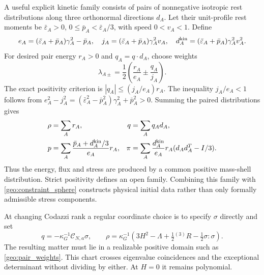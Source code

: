 A useful explicit kinetic family consists of pairs of nonnegative isotropic rest distributions along three orthonormal directions $d_A$. Let their unit-profile rest moments be $\bar\varepsilon_A>0$, $0\le\bar p_A<\bar\varepsilon_A/3$, with speed $0<v_A<1$. Define
\begin{equation}
 e_A=(\bar\varepsilon_A+\bar p_A)\gamma_A^2-\bar p_A,
 \quad j_A=(\bar\varepsilon_A+\bar p_A)\gamma_A^2v_A,
 \quad d_A^{\rm kin}=(\bar\varepsilon_A+\bar p_A)\gamma_A^2v_A^2.
 \label{geo:pair_coefficients}
\end{equation}
For desired pair energy $r_A>0$ and $q_A=q\cdot d_A$, choose weights
\begin{equation}
 \lambda_{A\pm}=\frac12\left(\frac{r_A}{e_A}\pm\frac{q_A}{j_A}\right).
 \label{geo:pair_weights}
\end{equation}
The exact positivity criterion is $|q_A|\le(j_A/e_A)r_A$. The inequality $j_A/e_A<1$ follows from
$e_A^2-j_A^2=(\bar\varepsilon_A^2-\bar p_A^2)\gamma_A^2+\bar p_A^2>0$.
Summing the paired distributions gives
\begin{align}
 \rho&=\sum_A r_A,&q&=\sum_Aq_Ad_A,\nonumber\\
 p&=\sum_A\frac{\bar p_A+d_A^{\rm kin}/3}{e_A}r_A,&
 \pi&=\sum_A\frac{d_A^{\rm kin}}{e_A}r_A
               (d_Ad_A^T-I/3).
 \label{geo:pair_moments}
\end{align}
Thus the energy, flux and stress are produced by a common positive mass-shell distribution. Strict positivity defines an open family. Combining this family with \eqref{geo:constraint_sphere} constructs physical initial data rather than only formally admissible stress components.

At changing Codazzi rank a regular coordinate choice is to specify $\sigma$ directly and set
\begin{equation}
 q=-\kappa_G^{-1}\mathcal C_{N,a}\sigma,\qquad
 \rho=\kappa_G^{-1}\left(3H^2-\Lambda+\tfrac12{}^{(3)}R
                                   -\tfrac12\sigma:\sigma\right).
 \label{geo:direct_chart}
\end{equation}
The resulting matter must lie in a realizable positive domain such as \eqref{geo:pair_weights}. This chart crosses eigenvalue coincidences and the exceptional determinant without dividing by either. At $H=0$ it remains polynomial.


